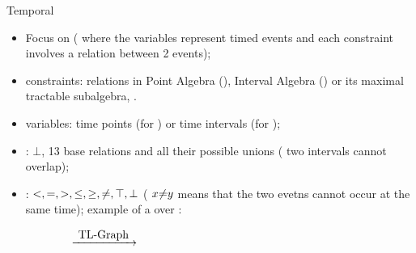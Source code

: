 \begin{frame}{Temporal \CSPNames{}}
    \begin{itemize}
        \item Focus on \TCSPNames{} (\ie{} \CSPNames{} where the variables represent timed events and each constraint involves a relation between 2 events);
        \item constraints: relations in Point Algebra (\PAName{}), Interval Algebra (\IAName{}) or its maximal tractable subalgebra,  \OrdHornName{}.
        \item variables: time points (for \PAName{}) or time intervals (for \IAName{});
        \item \IAName{}: $\bot$, 13 base relations and all their possible unions (\eg{} two intervals cannot overlap);
        \item \PAName{}: $<, =, >, \leq, \geq, \noteq{}, \top, \bot$ (\eg{} $x \noteq{} y$ means that the two evetns cannot occur at the same time); example of a \TCSPName{} over \PAName{}:
	\end{itemize}

    \begin{figure}
        \centering
        \begin{subfigure}{0.44\textwidth}
            \centering
        \end{subfigure}\hfill%
        \begin{subfigure}{0.1\textwidth}
            \centering
            $\xrightarrow{\mbox{ TL-Graph {}}}$
        \end{subfigure}\hfill%
        \begin{subfigure}{0.44\textwidth}
            \centering
\end{subfigure}
\end{figure}
\end{frame}
